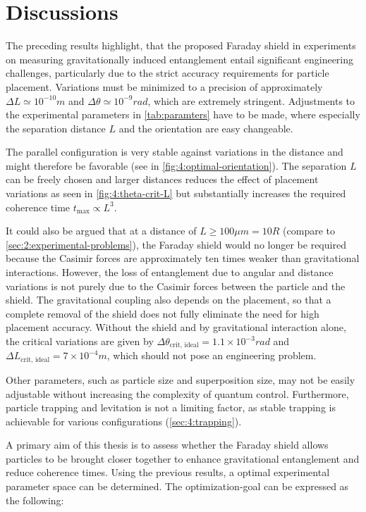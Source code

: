 \section{Discussions}\label{sec:4:discussion}
The preceding results highlight, that the proposed Faraday shield in experiments on measuring gravitationally induced entanglement entail significant engineering challenges, particularly due to the strict accuracy requirements for particle placement.
Variations must be minimized to a precision of approximately $\Delta L \simeq 10^{-10}\si{m}$ and $\Delta \theta \simeq 10^{-9}\si{rad}$, which are extremely stringent.
Adjustments to the experimental parameters in \cref{tab:paramters} have to be made, where especially the separation distance $L$ and the orientation are easy changeable.

The parallel configuration is very stable against variations in the distance and might therefore be favorable (see in \cref{fig:4:optimal-orientation}).
The separation $L$ can be freely chosen and larger distances reduces the effect of placement variations as seen in \cref{fig:4:theta-crit-L} but substantially increases the required coherence time $t_\mathrm{max} \propto L^3$.

It could also be argued that at a distance of $L \geq 100\si{\mu m} = 10 R$ (compare to \cref{sec:2:experimental-problems}), the Faraday shield would no longer be required because the Casimir forces are approximately ten times weaker than gravitational interactions.
However, the loss of entanglement due to angular and distance variations is not purely due to the Casimir forces between the particle and the shield.
The gravitational coupling also depends on the placement, so that a complete removal of the shield does not fully eliminate the need for high placement accuracy.
Without the shield and by gravitational interaction alone, the critical variations are given by $\Delta \theta_\mathrm{crit,\,ideal} = 1.1 \times 10^{-3}\si{rad}$ and $\Delta L_\mathrm{crit,\,ideal} = 7\times 10^{-4}\si{m}$, which should not pose an engineering problem.

Other parameters, such as particle size and superposition size, may not be easily adjustable without increasing the complexity of quantum control.
Furthermore, particle trapping and levitation is not a limiting factor, as stable trapping is achievable for various configurations (\cref{sec:4:trapping}).

A primary aim of this thesis is to assess whether the Faraday shield allows particles to be brought closer together to enhance gravitational entanglement and reduce coherence times. 
Using the previous results, a optimal experimental parameter space can be determined.
The optimization-goal can be expressed as the following:

